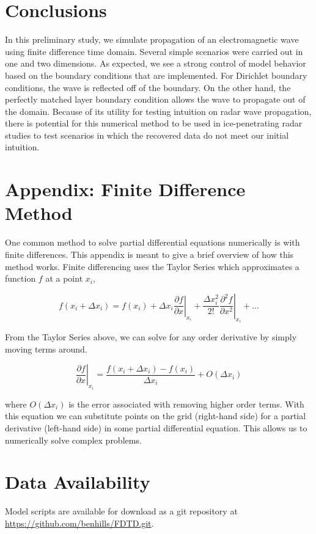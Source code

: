 \documentclass[a4paper]{article}
\begin{document}
\section{Conclusions}

In this preliminary study, we simulate propagation of an electromagnetic wave using finite difference time domain. Several simple scenarios were carried out in one and two dimensions. As expected, we see a strong control of model behavior based on the boundary conditions that are implemented. For Dirichlet boundary conditions, the wave is reflected off of the boundary. On the other hand, the perfectly matched layer boundary condition allows the wave to propagate out of the domain. Because of its utility for testing intuition on radar wave propagation, there is potential for this numerical method to be used in ice-penetrating radar studies to test scenarios in which the recovered data do not meet our initial intuition. 

\pagebreak
\section{Appendix: Finite Difference Method}

One common method to solve partial differential equations numerically is with finite differences. This appendix is meant to give a brief overview of how this method works. Finite differencing uses the Taylor Series which approximates a function $f$ at a point $x_i$, 

\begin{equation}
    f(x_i + \Delta x_i) = f(x_i) + \Delta x_i \left. \frac{\partial f}{\partial x} \right\vert_{x_i} + \frac{\Delta x_i^2}{2!} \left. \frac{\partial^2 f}{\partial x^2} \right\vert_{x_i} + \dots
\end{equation}

From the Taylor Series above, we can solve for any order derivative by simply moving terms around. 

\begin{equation}
    \left. \frac{\partial f}{\partial x} \right\vert_{x_i} = \frac{f(x_i + \Delta x_i) - f(x_i)}{\Delta x_i} + O(\Delta x_i)
\end{equation}

where $O(\Delta x_i)$ is the error associated with removing higher order terms. With this equation we can substitute points on the grid (right-hand side) for a partial derivative (left-hand side) in some partial differential equation. This allows us to numerically solve complex problems. 

\pagebreak
\section*{Data Availability}

Model scripts are available for download as a git repository at \url{https://github.com/benhills/FDTD.git}.

\printbibliography
\end{document}
